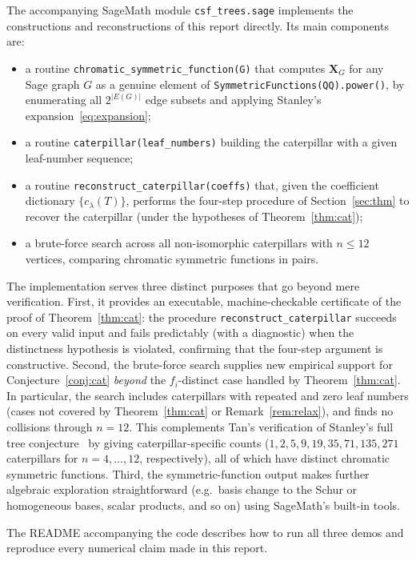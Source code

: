 \documentclass[11pt]{article}
\theoremstyle{definition}
\newcommand{\X}{\mathbf{X}}
\begin{document}
The accompanying SageMath module \texttt{csf\_trees.sage} implements
the constructions and reconstructions of this report directly.  Its
main components are:
\begin{itemize}[leftmargin=*]
\item a routine \texttt{chromatic\_symmetric\_function(G)} that
      computes $\X_G$ for any Sage graph $G$ as a genuine element of
      \texttt{SymmetricFunctions(QQ).power()}, by enumerating all
      $2^{|E(G)|}$ edge subsets and applying Stanley's
      expansion~\eqref{eq:expansion};
\item a routine \texttt{caterpillar(leaf\_numbers)} building the
      caterpillar with a given leaf-number sequence;
\item a routine \texttt{reconstruct\_caterpillar(coeffs)} that, given
      the coefficient dictionary $\{c_\lambda(T)\}$, performs the
      four-step procedure of Section~\ref{sec:thm} to recover the
      caterpillar (under the hypotheses of Theorem~\ref{thm:cat});
\item a brute-force search across all non-isomorphic caterpillars with
      $n\leq 12$ vertices, comparing chromatic symmetric functions in
      pairs.
\end{itemize}

The implementation serves three distinct purposes that go beyond mere
verification.  First, it provides an executable, machine-checkable
certificate of the proof of Theorem~\ref{thm:cat}: the procedure
\texttt{reconstruct\_caterpillar} succeeds on every valid input and
fails predictably (with a diagnostic) when the distinctness hypothesis
is violated, confirming that the four-step argument is constructive.
Second, the brute-force search supplies new empirical support for
Conjecture~\ref{conj:cat} \emph{beyond} the $f_i$-distinct case handled
by Theorem~\ref{thm:cat}.  In particular, the search includes
caterpillars with repeated and zero leaf numbers (cases not covered by
Theorem~\ref{thm:cat} or Remark~\ref{rem:relax}), and finds no
collisions through $n=12$.  This complements Tan's verification of
Stanley's full tree conjecture~\cite{Tan} by giving caterpillar-specific
counts ($1,2,5,9,19,35,71,135,271$ caterpillars for $n=4,\ldots,12$,
respectively), all of which have distinct chromatic symmetric functions.
Third, the symmetric-function output makes further algebraic exploration
straightforward (e.g.\ basis change to the Schur or homogeneous bases,
scalar products, and so on) using SageMath's built-in tools.

The README accompanying the code describes how to run all three demos
and reproduce every numerical claim made in this report.
\end{document}
